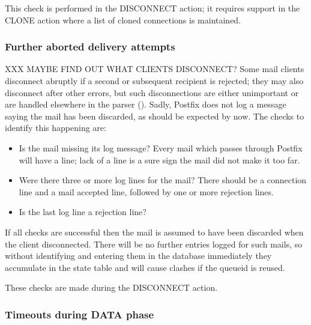 This check is performed in the DISCONNECT action; it requires support in
the CLONE action where a list of cloned connections is maintained.

\subsubsection{Further aborted delivery attempts}

XXX MAYBE FIND OUT WHAT CLIENTS DISCONNECT\@?  Some mail clients disconnect
abruptly if a second or subsequent recipient is rejected; they may also
disconnect after other errors, but such disconnections are either
unimportant or are handled elsewhere in the parser
().  Sadly, Postfix does not log a
message saying the mail has been discarded, as should be expected by now.
The checks to identify this happening are:

\begin{itemize}

    \item Is the mail missing its  log message?  Every mail
        which passes through Postfix will have a  line;
        lack of a  line is a sure sign the mail did not
        make it too far.

    \item Were there three or more  log lines for the mail?
        There should be a connection line and a mail accepted line,
        followed by one or more rejection lines.

    \item Is the last  log line a rejection line?

\end{itemize}

If all checks are successful then the mail is assumed to have been
discarded when the client disconnected.  There will be no further entries
logged for such mails, so without identifying and entering them in the
database immediately they accumulate in the state table and will cause
clashes if the queueid is reused.

These checks are made during the DISCONNECT action.

\subsubsection{Timeouts during DATA phase}

\label{timeouts-during-data-phase}

